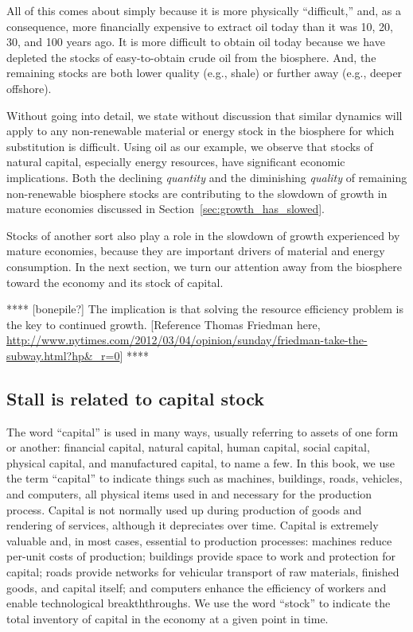 All of this comes about simply because it is 
more physically ``difficult,'' and, as a consequence, 
more financially expensive
to extract oil today than it was 10, 20, 30, and 100 years ago.
It is more difficult to obtain oil today because we have depleted
the stocks of easy-to-obtain crude oil from the biosphere.
And, the remaining stocks are both lower quality (e.g., shale)
or further away (e.g., deeper offshore).

Without going into detail, we state without discussion 
that similar dynamics will apply to 
any non-renewable material or energy stock in the biosphere
for which substitution is difficult.
Using oil as our example, we observe that 
stocks of natural capital, especially energy resources,
have significant economic implications.
Both the declining \emph{quantity} and 
the diminishing \emph{quality} of remaining non-renewable biosphere stocks 
are contributing to the slowdown of growth in mature economies
discussed in Section~\ref{sec:growth_has_slowed}.

Stocks of another sort also play a role 
in the slowdown of growth experienced by mature economies,
because they  are important drivers of material and energy consumption.
In the next section, we turn our attention 
away from the biosphere 
toward the economy and its stock of capital.



**** [bonepile?] The implication is that solving the resource efficiency problem
is the key to continued growth. [Reference Thomas Friedman here,
\url{http://www.nytimes.com/2012/03/04/opinion/sunday/friedman-take-the-subway.html?hp&_r=0}]
****


\subsection{Stall is related to capital stock}
\label{sec:stall_capital_stock}

The word ``capital'' is used in many ways, usually referring to assets
of one form or another: 
financial capital, 
natural capital, 
human capital, 
social capital,
physical capital, and
manufactured capital, 
to name a few.
In this book, 
we use the term ``capital'' to indicate things such as
machines, 
buildings, 
roads,
vehicles, and
computers,
all physical items used in and necessary for the production process.
Capital is not normally used up during production 
of goods and rendering of services, 
although it depreciates over time.
Capital is extremely valuable and, in most cases, essential to production processes:
machines reduce per-unit costs of production;
buildings provide space to work and protection for capital;
roads provide networks for vehicular transport 
of raw materials, finished goods, and capital itself; and
computers enhance the efficiency of workers and enable technological breakththroughs.
We use the word ``stock'' to indicate the total inventory of capital 
in the economy at a given point in time.

